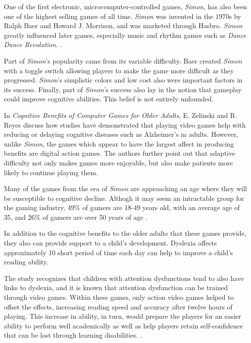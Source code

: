 One of the first electronic, microcomputer-controlled games, \textit{Simon},
has also been one of the highest selling games of all time.  \textit{Simon}
was invented in the 1970s by Ralph Baer and Howard J. Morrison, and
was marketed through Hasbro.  \textit{Simon} greatly influenced later games,
especially music and rhythm games such as \textit{Dance Dance Revolution}.
\citep{austin2016}.

Part of \textit{Simon}'s popularity came from its variable difficulty.  Baer
created \textit{Simon} with a toggle switch allowing players to make the game
more difficult as they progressed.  \textit{Simon}'s simplistic colors and low
cost also were important factors in its success.  Finally, part of
\textit{Simon}'s success also lay in the notion that gameplay could improve
cognitive abilities.  This belief is not entirely unfounded.

In \textit{Cognitive Benefits of Computer Games for Older Adults},
E. Zelinski and R. Reyes discuss how studies have demonstrated that playing video
games help with reducing or delaying cognitive diseases such as
Alzheimer’s in adults.  However, unlike \textit{Simon}, the games which appear
to have the largest affect in producing benefits are digital action games.
The authors further point out that adaptive difficulty not only makes
games more enjoyable, but also make patients more likely to continue
playing them.

Many of the games from the era of \textit{Simon} are approaching an age
where they will be susceptible to cognitive decline.  Althogh it
may seem an intractable group for the gaming industry, 49\% of gamers
are 18-49 years old, with an average age of 35, and 26\% of gamers are
over 50 years of age \citep{zelinski2009}.

In addition to the cognitive benefits to the older adults that these games
provide, they also can provide support to a child's development. Dyslexia 
affects approximately 10%
short period of time each day can help to improve a child's reading ability.

The study recognizes that children with attention dysfunctions tend to also
have links to dyslexia, and it is known that attention dysfunction can be
trained through video games. Within these games, only action video games helped
to offset the effects, increasing reading speed and accuracy after twelve hours
of playing. This increase in ability, in turn, would prepare the players for an
easier ability to perform well academically as well as help players retain
self-confidence that can be lost through learning disabilities.
\citep{franceschini2013}.
